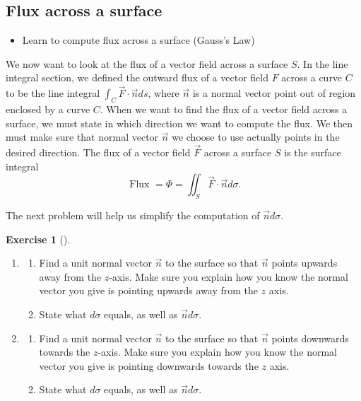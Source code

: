 \documentclass[10pt,]{book}
\theoremstyle{plain}
\theoremstyle{definition}
\theoremstyle{definition}
\theoremstyle{definition}
\theoremstyle{definition}
\newtheorem{exploration}[project]{Exercise}
\theoremstyle{definition}
\numberwithin{equation}{section}
\newcommand{\ds}{\displaystyle}
\begin{document}
\subsection[{Flux across a surface}]{Flux across a surface}\label{subsection-36}
\leavevmode%
\begin{itemize}[label=\textbullet]
\item{}Learn to compute flux across a surface (Gauss's Law)%
\end{itemize}
We now want to look at the flux of a vector field across a surface \(S\). In the line integral section, we defined the outward flux of a vector field \(F\) across a curve \(C\) to be the line integral \(\ds \int_C \vec F\cdot \vec n ds\), where \(\vec n\) is a normal vector point out of region enclosed by a curve \(C\). When we want to find the flux of a vector field across a surface, we must state in which direction we want to compute the flux. We then must make sure that normal vector \(\vec n\) we choose to use actually points in the desired direction. The flux of a vector field \(\vec F\) across a surface \(S\) is the surface integral%
\begin{equation*}
\text{ Flux } =\Phi 
= \iint_S \vec F\cdot \vec n d\sigma 
.
\end{equation*}
%
\par
The next problem will help us simplify the computation of \(\vec nd\sigma\).%
\begin{exploration}[]\label{exploration-282}
\leavevmode%
\begin{enumerate}[font=\bfseries,label=(\alph*),ref=\alph*]
\item\label{task-766} \begin{enumerate}[font=\bfseries,label=(\roman*),ref=\theenumi.\roman*]
\item\label{task-767} Find a unit normal vector \(\vec n\) to the surface so that \(\vec n\) points upwards away from the \(z\)-axis. Make sure you explain how you know the normal vector you give is pointing upwards away from the \(z\) axis.%
\item\label{task-768} State what \(d\sigma\) equals, as well as \(\vec n d\sigma\).%
\end{enumerate}
\item\label{task-769} \begin{enumerate}[font=\bfseries,label=(\roman*),ref=\theenumi.\roman*]
\item\label{task-770} Find a unit normal vector \(\vec n\) to the surface so that \(\vec n\) points downwards towards the \(z\)-axis. Make sure you explain how you know the normal vector you give is pointing downwards towards the \(z\) axis.%
\item\label{task-771} State what \(d\sigma\) equals, as well as \(\vec n d\sigma\).%
\end{enumerate}
\end{enumerate}
\end{exploration}
\end{document}
